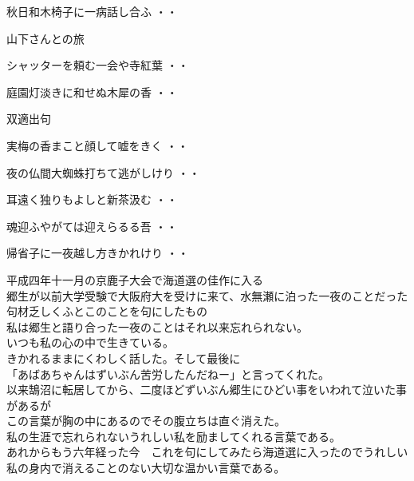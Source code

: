 \begin{shiika}秋日和木椅子に一病話し合ふ
\hfill{・・}\end{shiika}
\vspace{0.6cm}
山下さんとの旅
\begin{shiika}シャッターを頼む一会や寺紅葉
\hfill{・・}\end{shiika}
\begin{shiika}庭園灯淡きに和せぬ木犀の香
\hfill{・・}\end{shiika}
\vspace{0.6cm}
双適出句
\begin{shiika}実梅の香まこと顔して嘘をきく
\hfill{・・}\end{shiika}
\begin{shiika}夜の仏間大蜘蛛打ちて逃がしけり
\hfill{・・}\end{shiika}
\begin{shiika}耳遠く独りもよしと新茶汲む
\hfill{・・}\end{shiika}
\begin{shiika}魂迎ふやがては迎えらるる吾
\hfill{・・}\end{shiika}
\begin{shiika}帰省子に一夜越し方きかれけり
\hfill{・・}\end{shiika}
\qquad\qquad\qquad 平成四年十一月の京鹿子大会で海道選の佳作に入る\\
\qquad\qquad\qquad 郷生が以前大学受験で大阪府大を受けに来て、水無瀬に泊った一夜のことだった\\
\qquad\qquad\qquad 句材乏しくふとこのことを句にしたもの\\
\qquad\qquad\qquad 私は郷生と語り合った一夜のことはそれ以来忘れられない。\\
\qquad\qquad\qquad いつも私の心の中で生きている。\\
\qquad\qquad\qquad きかれるままにくわしく話した。そして最後に\\
\qquad\qquad\qquad「あばあちゃんはずいぶん苦労したんだねー」と言ってくれた。\\
\qquad\qquad\qquad 以来鵠沼に転居してから、二度ほどずいぶん郷生にひどい事をいわれて泣いた事があるが\\
\qquad\qquad\qquad この言葉が胸の中にあるのでその腹立ちは直ぐ消えた。\\
\qquad\qquad\qquad 私の生涯で忘れられないうれしい私を励ましてくれる言葉である。\\
\qquad\qquad\qquad あれからもう六年経った今　これを句にしてみたら海道選に入ったのでうれしい\\
\qquad\qquad\qquad 私の身内で消えることのない大切な温かい言葉である。\\

